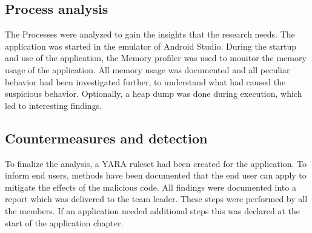 \subsection{Process analysis}
The Processes were analyzed to gain the insights that the research needs.
The application was started in the emulator of Android Studio.
During the startup and use of the application, the Memory profiler was used to monitor the memory usage of the application.
All memory usage was documented and all peculiar behavior had been investigated further, to understand what had caused the suspicious behavior.
Optionally, a heap dump was done during execution, which led to interesting findings.

\subsection{Countermeasures and detection}

To finalize the analysis, a YARA ruleset had been created for the application.
To inform end users, methods have been documented that the end user can apply to mitigate the effects of the malicious code.
All findings were documented into a report which was delivered to the team leader.
These steps were performed by all the members.
If an application needed additional steps this was declared at the start of the application chapter.